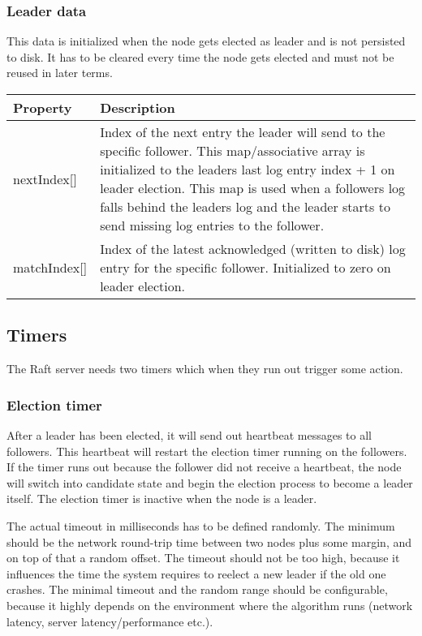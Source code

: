\subsubsection*{Leader data}

This data is initialized when the node gets elected as leader and is not persisted to disk.
It has to be cleared every time the node gets elected and must not be reused in later terms.

\begin{tabularx}{\textwidth}{ | p{80px} | X | }
\hline
\textbf{Property} & \textbf{Description} \\ \hline
nextIndex[] & Index of the next entry the leader will send to the specific follower. This map/associative array is initialized to the leaders last log entry index + 1 on leader election.
This map is used when a followers log falls behind the leaders log and the leader starts to send missing log entries to the follower. \\ \hline
matchIndex[] & Index of the latest acknowledged (written to disk) log entry for the specific follower. Initialized to zero on leader election. \\ \hline
\end{tabularx}

\subsection{Timers}
The Raft server needs two timers which when they run out trigger some action.

\subsubsection*{Election timer}
After a leader has been elected, it will send out heartbeat messages to all followers. This heartbeat
will restart the election timer running on the followers. If the timer runs out because the follower did not 
receive a heartbeat, the node will switch into candidate state and begin the election process to become a leader itself.
The election timer is inactive when the node is a leader.

The actual timeout in milliseconds has to be defined randomly. The minimum should be the network round-trip time between two nodes plus some margin,
and on top of that a random offset. The timeout should not be too high, because it influences the time the system requires to reelect a new leader
if the old one crashes. The minimal timeout and the random range should be configurable, because it highly depends on the environment where the algorithm runs
(network latency, server latency/performance etc.).

